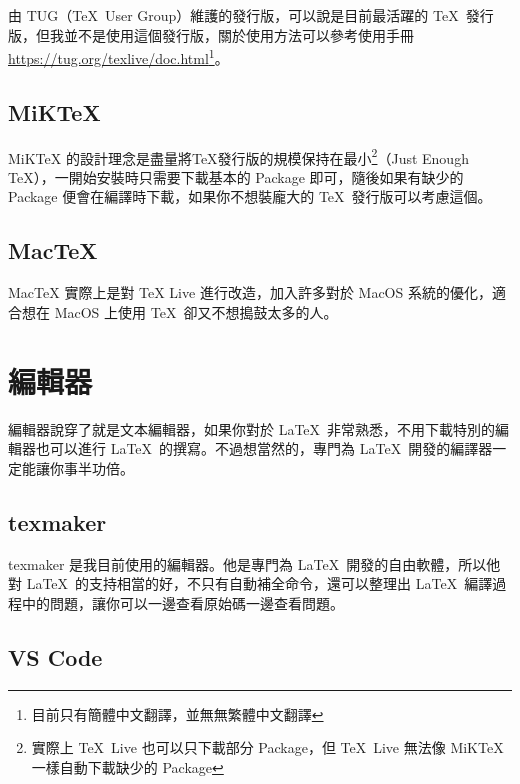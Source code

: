 由 TUG（\TeX\ User Group）維護的發行版，可以說是目前最活躍的 \TeX\ 發行版，但我並不是使用這個發行版，關於使用方法可以參考使用手冊 \url{https://tug.org/texlive/doc.html}\footnote{目前只有簡體中文翻譯，並無無繁體中文翻譯}。

\subsection{MiK\TeX}

MiKTeX 的設計理念是盡量將\TeX 發行版的規模保持在最小\footnote{實際上 \TeX\ Live 也可以只下載部分 Package，但 \TeX\ Live 無法像 MiK\TeX 一樣自動下載缺少的 Package}（Just Enough \TeX ），一開始安裝時只需要下載基本的 Package 即可，隨後如果有缺少的 Package 便會在編譯時下載，如果你不想裝龐大的 \TeX\ 發行版可以考慮這個。

\subsection{Mac\TeX}

MacTeX 實際上是對 TeX Live 進行改造，加入許多對於 MacOS 系統的優化，適合想在 MacOS 上使用 \TeX\ 卻又不想搗鼓太多的人。

\section{編輯器}

編輯器說穿了就是文本編輯器，如果你對於 \LaTeX\ 非常熟悉，不用下載特別的編輯器也可以進行 \LaTeX\ 的撰寫。不過想當然的，專門為 \LaTeX\ 開發的編譯器一定能讓你事半功倍。

\subsection{texmaker}

texmaker 是我目前使用的編輯器。他是專門為 \LaTeX\ 開發的自由軟體，所以他對 \LaTeX\ 的支持相當的好，不只有自動補全命令，還可以整理出 \LaTeX\ 編譯過程中的問題，讓你可以一邊查看原始碼一邊查看問題。

%

\subsection{VS Code}

